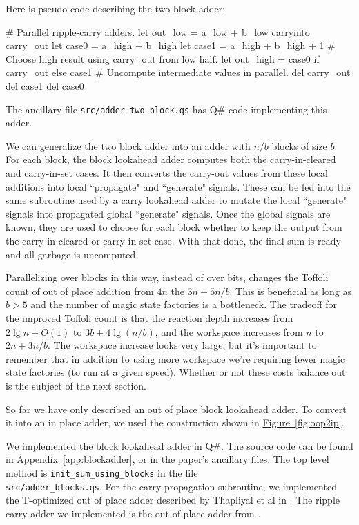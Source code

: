\documentclass[onecolumn,unpublished]{quantumarticle}
\theoremstyle{definition}
\theoremstyle{definition}
\theoremstyle{definition}
\DeclareRobustCommand{\app}[1]{\hyperref[app:#1]{Appendix~\ref*{app:#1}}}
\newcommand{\fig}[1]{\hyperref[fig:#1]{Figure~\ref*{fig:#1}}}
\begin{document}
Here is pseudo-code describing the two block adder:

\begin{python}
    # Parallel ripple-carry adders.
    let out_low = a_low + b_low carryinto carry_out
    let case0 = a_high + b_high
    let case1 = a_high + b_high + 1
    # Choose high result using carry_out from low half.
    let out_high = case0 if carry_out else case1
    # Uncompute intermediate values in parallel.
    del carry_out
    del case1
    del case0
\end{python}

The ancillary file \texttt{src/adder\_two\_block.qs} has Q\# code implementing this adder.

We can generalize the two block adder into an adder with $n/b$ blocks of size $b$.
For each block, the block lookahead adder computes both the carry-in-cleared and carry-in-set cases.
It then converts the carry-out values from these local additions into local ``propagate" and ``generate" signals.
These can be fed into the same subroutine used by a carry lookahead adder to mutate the local ``generate" signals into propagated global ``generate" signals.
Once the global signals are known, they are used to choose for each block whether to keep the output from the carry-in-cleared or carry-in-set case.
With that done, the final sum is ready and all garbage is uncomputed.

Parallelizing over blocks in this way, instead of over bits, changes the Toffoli count of out of place addition from $4n$ the $3n + 5n/b$.
This is beneficial as long as $b > 5$ and the number of magic state factories is a bottleneck.
The tradeoff for the improved Toffoli count is that the reaction depth increases from $2 \lg n + O(1)$ to $3 b + 4 \lg(n/b)$, and the workspace increases from $n$ to $2n + 3n/b$.
The workspace increase looks very large, but it's important to remember that in addition to using more workspace we're requiring fewer magic state factories (to run at a given speed).
Whether or not these costs balance out is the subject of the next section.

So far we have only described an out of place block lookahead adder.
To convert it into an in place adder, we used the construction shown in \fig{oop2ip}.

We implemented the block lookahead adder in Q\#.
The source code can be found in \app{blockadder}, or in the paper's ancillary files.
The top level method is \texttt{init\_sum\_using\_blocks} in the file \\\texttt{src/adder\_blocks.qs}.
For the carry propagation subroutine, we implemented the T-optimized out of place adder described by Thapliyal et al in \cite{thapliyal2020lookahead}.
The ripple carry adder we implemented is the out of place adder from \cite{gidney2018halving}.
\end{document}
